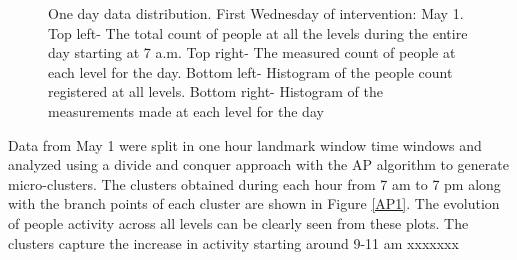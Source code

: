 \documentclass[../UNBThesis2.tex]{subfiles}
\begin{document}
\begin{figure}[!h]
    \caption{One day data distribution. First Wednesday of intervention: May 1. Top left- The total count of people at all the levels during the entire day starting at 7 a.m. Top right- The measured count of people at each level for the day. Bottom left- Histogram of the people count registered at all levels. Bottom right- Histogram of the measurements made at each level for the day }
    \label{1daystat}
\end{figure}

Data from May 1 were split in one hour landmark window time windows and analyzed using a divide and conquer approach with the AP algorithm to generate micro-clusters. The clusters obtained during each hour from 7 am to 7 pm along with the branch points of each cluster are shown in Figure \ref{AP1}. The evolution of people activity across all levels can be clearly seen from these plots. The clusters capture the increase in activity starting around 9-11 am xxxxxxx
\end{document}
